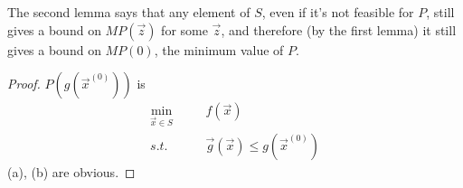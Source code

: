 \documentclass[11pt,a4paper]{article}
\newtheorem{lemma}{Lemma}
\begin{document}
\begin{center}
\end{center}
The second lemma says that any element of $S$, even if it's not feasible for $P$, still gives a bound on $MP(\vec{z})$ for some $\vec{z}$, and therefore (by the first lemma) it still gives a bound on $MP(0)$, the minimum value of $P$.
\begin{proof}
    $P(g(\vec{x}^{(0)}))$ is
    \begin{equation}
        \begin{aligned}
            \min_{\vec{x}\in S}&\quad &f(\vec{x})\\
            s.t.& &\vec{g}(\vec{x})\leq g(\vec{x}^{(0)})
        \end{aligned}
        \nonumber
    \end{equation}
    (a), (b) are obvious.
\end{proof}
\end{document}
